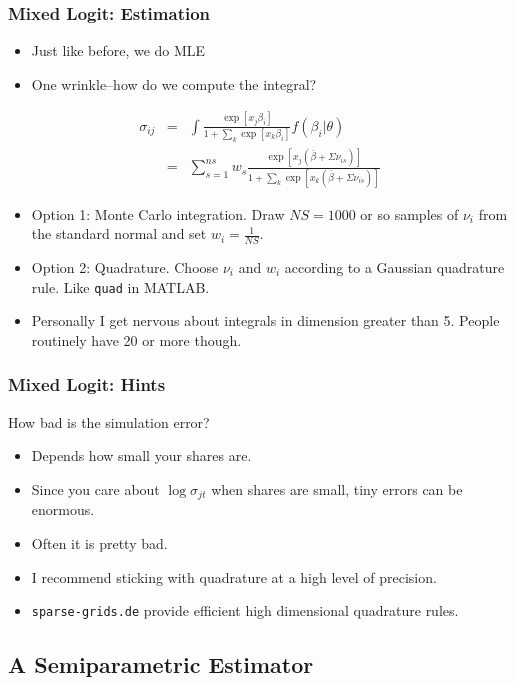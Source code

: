 \documentclass[aspectratio=169,11pt]{beamer}
\begin{document}
\begin{frame}
\frametitle{Mixed Logit: Estimation}
 \begin{itemize}
\item Just like before, we do MLE
\item One wrinkle--how do we compute the integral?
 \end{itemize}
\begin{eqnarray*}
\sigma_{ij} &=& \int \frac{\exp[x_{j} \beta_i  ]}{1+\sum_k \exp[x_{k} \beta_i  ]} f(\beta_i | \theta) \\
 &=& \sum_{s=1}^{ns} w_s \frac{\exp[x_{j} (\overline{\beta} + \Sigma \nu_{is})  ]}{1+\sum_k \exp[x_{k} (\overline{\beta} + \Sigma \nu_{is})  ]} 
\end{eqnarray*}
 \begin{itemize}
\item Option 1: Monte Carlo integration.  Draw $NS=1000$ or so samples of $\nu_i$ from the standard normal and set $w_i = \frac{1}{NS}$.
\item Option 2: Quadrature. Choose $\nu_i$ and $w_i$ according to a Gaussian quadrature rule. Like \texttt{quad} in MATLAB.
\item Personally I get nervous about integrals in dimension greater than 5. People routinely have 20 or more though.
 \end{itemize}
\end{frame}

\begin{frame}
\frametitle{Mixed Logit: Hints}
 How bad is the simulation error?
 \begin{itemize}
\item Depends how small your shares are. 
\item Since you care about $\log \sigma_{jt}$ when shares are small, tiny errors can be enormous.
\item Often it is pretty bad.
\item I recommend sticking with quadrature at a high level of precision.
\item \texttt{sparse-grids.de} provide efficient high dimensional quadrature rules.
 \end{itemize}
\end{frame}

\subsection{A Semiparametric Estimator}
\end{document}
